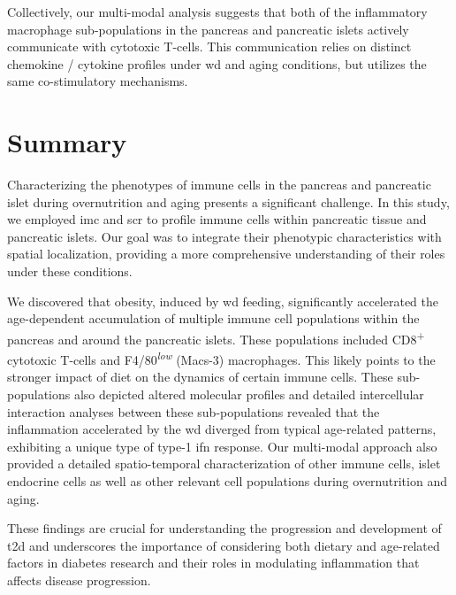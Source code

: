 \par Collectively, our multi-modal analysis suggests that both of the inflammatory macrophage sub-populations in the pancreas and pancreatic islets actively communicate with cytotoxic T-cells. This communication relies on distinct chemokine / cytokine profiles under \gls{wd} and aging conditions, but utilizes the same co-stimulatory mechanisms. 


\section[Summary]{Summary}
\label{sec:chp2_summary}

\par Characterizing the phenotypes of immune cells in the pancreas and pancreatic islet during overnutrition and aging presents a significant challenge. In this study, we employed \gls{imc} and \gls{scr} to profile immune cells within pancreatic tissue and pancreatic islets. Our goal was to integrate their phenotypic characteristics with spatial localization, providing a more comprehensive understanding of their roles under these conditions.\\

\par We discovered that obesity, induced by \acrfull{wd} feeding, significantly accelerated the age-dependent accumulation of multiple immune cell populations within the pancreas and around the pancreatic islets. These populations included CD8\textsuperscript{+} cytotoxic T-cells and F4/80\textsuperscript{\textit{low}} (Macs-3) macrophages. This likely points to the stronger impact of diet on the dynamics of certain immune cells. These sub-populations also depicted altered molecular profiles and detailed intercellular interaction analyses between these sub-populations revealed that the inflammation accelerated by the \gls{wd} diverged from typical age-related patterns, exhibiting a unique type of type-1 \gls{ifn} response. Our multi-modal approach also provided a detailed spatio-temporal characterization of other immune cells, islet endocrine cells as well as other relevant cell populations during overnutrition and aging.\\

\par These findings are crucial for understanding the progression and development of \gls{t2d} and underscores the importance of considering both dietary and age-related factors in diabetes research and their roles in modulating inflammation that affects disease progression.\\

